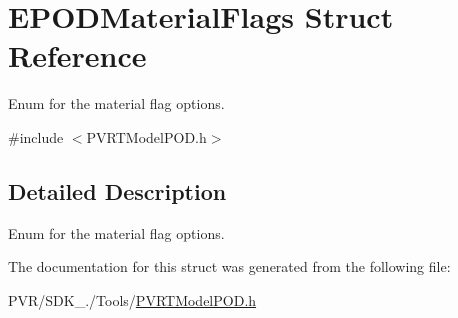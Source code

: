 \hypertarget{struct_e_p_o_d_material_flags}{\section{E\+P\+O\+D\+Material\+Flags Struct Reference}
\label{struct_e_p_o_d_material_flags}
}


Enum for the material flag options.  




{\ttfamily \#include $<$P\+V\+R\+T\+Model\+P\+O\+D.\+h$>$}



\subsection{Detailed Description}
Enum for the material flag options. 



 

The documentation for this struct was generated from the following file\+:\begin{DoxyCompactItemize}
\item 
P\+V\+R/\+S\+D\+K\+\_./\+Tools/\hyperlink{_p_v_r_t_model_p_o_d_8h}{P\+V\+R\+T\+Model\+P\+O\+D.\+h}\end{DoxyCompactItemize}
